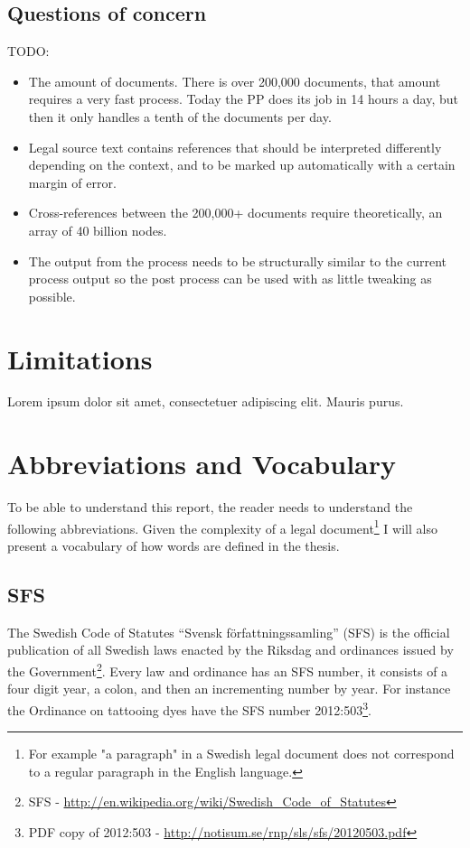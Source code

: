 \documentclass[a4paper,11pt]{kth-mag}
\begin{document}
\subsection{Questions of concern}

TODO:

\begin{itemize} 
\item The amount of documents. There is over 200,000 documents, that amount requires a very fast process. Today the PP does its job in 14 hours a day, but then it only handles a tenth of the documents per day. 
\item Legal source text contains references that should be interpreted differently depending on the context, and to be marked up automatically with a certain margin of error.
\item Cross-references between the 200,000+ documents require theoretically, an array of 40 billion nodes.
\item The output from the process needs to be structurally similar to the current process output so the post process can be used with as little tweaking as possible.
\end{itemize}

\section{Limitations}
Lorem ipsum dolor sit amet, consectetuer adipiscing elit. Mauris
purus. 

\section{Abbreviations and Vocabulary} To be able to understand this report,
the reader needs to understand the following abbreviations. Given the
complexity of a legal document\footnote{For example "a paragraph" in a Swedish
legal document does not correspond to a regular paragraph in the English
language.} I will also present a vocabulary of how words are defined in the
thesis.

\subsection*{SFS} The Swedish Code of Statutes “Svensk författningssamling”
(SFS) is the official publication of all Swedish laws enacted by the Riksdag
and ordinances issued by the Government\footnote{SFS -
\url{http://en.wikipedia.org/wiki/Swedish_Code_of_Statutes}}. Every law and
ordinance has an SFS number, it consists of a four digit year, a colon, and
then an incrementing number by year. For instance the Ordinance on tattooing
dyes have the SFS number 2012:503\footnote{PDF copy of 2012:503 -
\url{http://notisum.se/rnp/sls/sfs/20120503.pdf}}.
\end{document}

